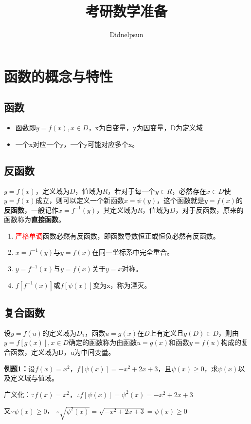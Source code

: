 \documentclass[UTF8, 12pt]{ctexart}
\author{Didnelpsun}
\title{考研数学准备}
\begin{document}
\maketitle
\thispagestyle{empty}
\tableofcontents
\thispagestyle{empty}
\newpage
\pagestyle{plain}
\setcounter{page}{1}
\section{函数的概念与特性}
\subsection{函数}
\begin{itemize}
    \item 函数即$y=f(x),x\in D$，x为自变量，y为因变量，D为定义域
    \item 一个x对应一个y，一个y可能对应多个x。
\end{itemize}
\subsection{反函数}
$y=f(x)$，定义域为$D$，值域为$R$，若对于每一个$y\in R$，必然存在$x\in D$使$y=f(x)$成立，则可以定义一个新函数$x=\psi(y)$，这个函数就是$y=f(x)$的\textbf{反函数}，一般记作$x=f^{-1}(y)$，其定义域为$R$，值域为$D$，对于反函数，原来的函数称为\textbf{直接函数}。
\begin{enumerate}
    \item \textcolor{red}{严格单调}函数必然有反函数，即函数导数恒正或恒负必然有反函数。
    \item $x=f^{-1}(y)$与$y=f(x)$在同一坐标系中完全重合。
    \item $y=f^{-1}(x)$与$y=f(x)$关于$y=x$对称。
    \item $f[f^{-1}(x)]$或$f[\psi(x)]$变为x，称为湮灭。
\end{enumerate}
\subsection{复合函数}
设$y=f(u)$的定义域为$D_1$，函数$u=g(x)$在$D$上有定义且$g(D)\in D$，则由$y=f[g(x)],x\in D$确定的函数称为由函数$u=g(x)$和函数$y=f(u)$构成的复合函数，定义域为D，u为中间变量。

\textbf{例题1：}设$f(x)=x^2$，$f[\psi(x)]=-x^2+2x+3$，且$\psi(x)\geqslant 0$，求$\psi(x)$以及定义域与值域。

广义化：$\because f(x)=x^2$，$\therefore f[\psi(x)]=\psi^2(x)=-x^2+2x+3$

又$\because\psi(x)\geqslant 0$， $\therefore\sqrt{\psi^2(x)}=\sqrt{-x^2+2x+3}=\psi(x)\geqslant 0$
\end{document}

